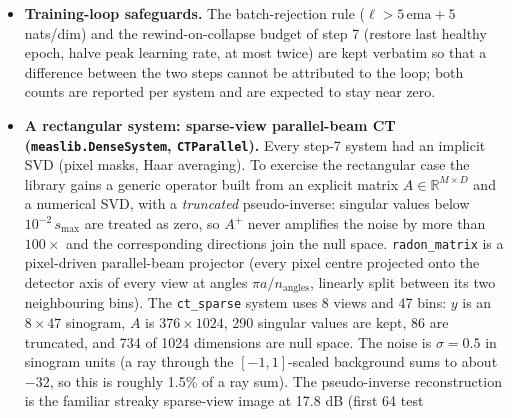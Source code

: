\documentclass[11pt]{article}
\begin{document}
\begin{itemize}
        but the \emph{sampling} direction can still overflow: for $z$ off the
        data manifold, $e^{z_a}$ chained across four blocks can reach
        \texttt{inf} in an under-trained or extrapolating head. In a
        32-step smoke test on \texttt{sr\_4x} the official unbounded head
        produced 60 of 64 non-finite posterior samples while the forward
        map round-tripped to $4 \times 10^{-6}$; the bounded head
        ($8\tanh(x_a/8)$ in both directions, step 7's construction) produced
        0 of 64. The bound is the default; the \texttt{sr\_4x\_unbounded}
        system re-runs \texttt{sr\_4x} with the official head to measure its
        effect on a trained model rather than assume it.
  \item \textbf{Training-loop safeguards.} The batch-rejection rule
        ($\ell > 5\,\mathrm{ema} + 5$ nats/dim) and the rewind-on-collapse
        budget of step 7 (restore last healthy epoch, halve peak learning
        rate, at most twice) are kept verbatim so that a difference between
        the two steps cannot be attributed to the loop; both counts are
        reported per system and are expected to stay near zero.
  \item \textbf{A rectangular system: sparse-view parallel-beam CT
        (\texttt{measlib.DenseSystem}, \texttt{CTParallel}).} Every step-7
        system had an implicit SVD (pixel masks, Haar averaging). To exercise
        the rectangular case the library gains a generic operator built from
        an explicit matrix $A \in \mathbb{R}^{M \times D}$ and a numerical
        SVD, with a \emph{truncated} pseudo-inverse: singular values below
        $10^{-2}\,s_{\max}$ are treated as zero, so $A^{+}$ never amplifies
        the noise by more than $100\times$ and the corresponding directions
        join the null space. \texttt{radon\_matrix} is a pixel-driven
        parallel-beam projector (every pixel centre projected onto the
        detector axis of every view at angles $\pi a/n_{\mathrm{angles}}$,
        linearly split between its two neighbouring bins). The
        \texttt{ct\_sparse} system uses 8 views and 47 bins: $y$ is an
        $8 \times 47$ sinogram, $A$ is $376 \times 1024$, 290 singular values
        are kept, 86 are truncated, and 734 of 1024 dimensions are null
        space. The noise is $\sigma = 0.5$ in sinogram units (a ray through
        the $[-1,1]$-scaled background sums to about $-32$, so this is
        roughly 1.5\% of a ray sum). The pseudo-inverse reconstruction is
        the familiar streaky sparse-view image at 17.8 dB (first 64 test

\end{itemize}
\end{document}
